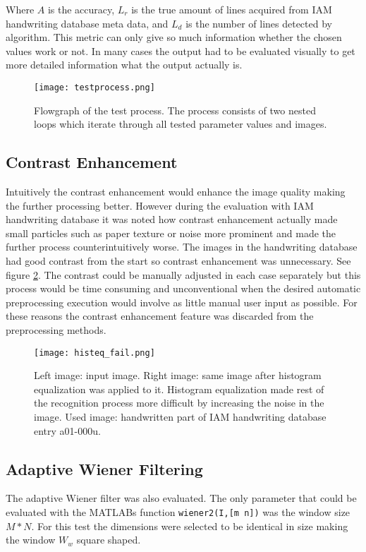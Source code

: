 \documentclass{article}
\def\code#1{\texttt{#1}}
\begin{document}
    Where $A$ is the accuracy, $L_r$ is the true amount of lines acquired from IAM handwriting database meta data, and $L_d$ is the number of lines detected by algorithm. This metric can only give so much information whether the chosen values work or not. In many cases the output had to be evaluated visually to get more detailed information what the output actually is.

    \begin{figure}[!ht]
      \centering
      \texttt{[image: testprocess.png]}
      \caption{Flowgraph of the test process. The process consists of two nested loops which iterate through all tested parameter values and images.
      \label{fig:testprocess}}
    \end{figure}

  \subsection{Contrast Enhancement}
    Intuitively the contrast enhancement would enhance the image quality making the further processing better. However during the evaluation with IAM handwriting database it was noted how contrast enhancement actually made small particles such as paper texture or noise more prominent and made the further process counterintuitively worse. The images in the handwriting database had good contrast from the start so contrast enhancement was unnecessary. See figure \ref{fig:histeqfail}. The contrast could be manually adjusted in each case separately but this process would be time consuming and unconventional when the desired automatic preprocessing execution would involve as little manual user input as possible. For these reasons the contrast enhancement feature was discarded from the preprocessing methods.

    \begin{figure}[!ht]
      \centering
      \texttt{[image: histeq\_fail.png]}
      \caption{Left image: input image. Right image: same image after histogram equalization was applied to it. Histogram equalization made rest of the recognition process more difficult by increasing the noise in the image. Used image: handwritten part of IAM handwriting database entry a01-000u.
      \label{fig:histeqfail}}
    \end{figure}

  \subsection{Adaptive Wiener Filtering}
    The adaptive Wiener filter was also evaluated. The only parameter that could be evaluated with the MATLABs function \code{wiener2(I,[m n])} was the window size $M * N$. For this test the dimensions were selected to be identical in size making the window $W_w$ square shaped.
\end{document}
